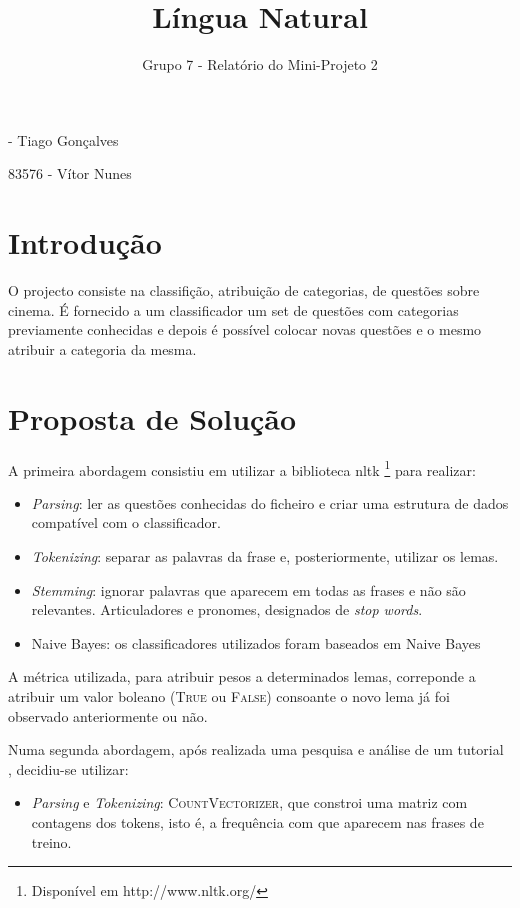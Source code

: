 \documentclass[12pt]{article}
\begin{document}
    \title{\vspace{-3cm}Língua Natural}
    \author{Grupo 7 - Relatório do Mini-Projeto 2}
    \date{}
    
     - Tiago Gonçalves
    
    83576 - Vítor Nunes
    
    \section*{Introdução}
    O projecto consiste na classifição, atribuição de categorias, de questões sobre cinema. É fornecido a um classificador um set de questões 
    com categorias previamente conhecidas e depois é possível colocar novas questões e o mesmo atribuir a categoria da mesma.  
    \section*{Proposta de Solução}
    A primeira abordagem consistiu em utilizar a biblioteca nltk \footnote{Disponível em http://www.nltk.org/} para realizar:
    \begin{itemize}
        \item{\textit{Parsing}: ler as questões conhecidas do ficheiro e criar uma estrutura de dados compatível com o classificador.}
        \item{\textit{Tokenizing}: separar as palavras da frase e, posteriormente, utilizar os lemas.}
        \item{\textit{Stemming}: ignorar palavras que aparecem em todas as frases e não são relevantes. Articuladores e pronomes, designados de \textit{stop words}.}
        \item{Naive Bayes: os classificadores utilizados foram baseados em Naive Bayes}
    \end{itemize}
    A métrica utilizada, para atribuir pesos a determinados lemas, correponde a atribuir um valor boleano (\textsc{True} ou \textsc{False}) consoante
    o novo lema já foi observado anteriormente ou não.

    Numa segunda abordagem, após realizada uma pesquisa e análise de um tutorial \cite{sklearn_tutorial}, decidiu-se utilizar:
    \begin{itemize}
        \item{\textit{Parsing} e \textit{Tokenizing}: \textsc{CountVectorizer}, que constroi uma matriz com contagens dos tokens, isto é, a frequência com que aparecem nas frases de treino.}
    \end{itemize}
\end{document}
